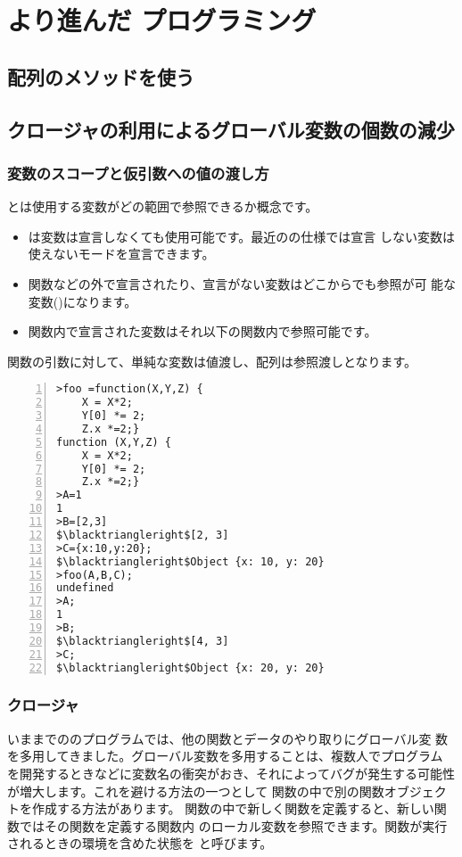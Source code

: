 \section{より進んだ \JS プログラミング}
\subsection{配列のメソッドを使う}

\subsection{クロージャの利用によるグローバル変数の個数の減少}
\subsubsection{変数のスコープと仮引数への値の渡し方}
とは使用する変数がどの範囲で参照できるか概念です。
\begin{itemize}
 \item \JS は変数は宣言しなくても使用可能です。最近の\JS の仕様では宣言
			 しない変数は使えないモードを宣言できます。
 \item 関数などの外で宣言されたり、宣言がない変数はどこからでも参照が可
			 能な変数()になります。
 \item 関数内で宣言された変数はそれ以下の関数内で参照可能です。
\end{itemize}
関数の引数に対して、単純な変数は値渡し、配列は参照渡しとなります。
\begin{Verbatim}[numbers=left, fontsize=\small,
	commandchars=\\//,codes={\catcode`$=3\catcode`^=7}]
>foo =function(X,Y,Z) {
    X = X*2;
    Y[0] *= 2;
    Z.x *=2;}
function (X,Y,Z) {
    X = X*2;
    Y[0] *= 2;
    Z.x *=2;}
>A=1
1
>B=[2,3]
$\blacktriangleright$[2, 3]
>C={x:10,y:20};
$\blacktriangleright$Object {x: 10, y: 20}
>foo(A,B,C);
undefined
>A;
1
>B;
$\blacktriangleright$[4, 3]
>C;
$\blacktriangleright$Object {x: 20, y: 20}
\end{Verbatim}
\subsubsection{クロージャ}
いままでの\JS のプログラムでは、他の関数とデータのやり取りにグローバル変
数を多用してきました。グローバル変数を多用することは、複数人でプログラム
を開発するときなどに変数名の衝突がおき、それによってバグが発生する可能性
が増大します。これを避ける方法の一つとして%
関数の中で別の関数オブジェクトを作成する方法があります。
関数の中で新しく関数を定義すると、新しい関数ではその関数を定義する関数内
のローカル変数を参照できます。関数が実行されるときの環境を含めた状態を
と呼びます。

